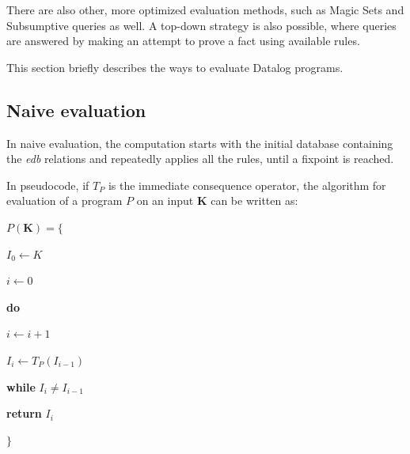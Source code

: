 \documentclass{pracamgr}
\theoremstyle{plain}
\theoremstyle{definition}
\theoremstyle{remark}
\begin{document}
There are also other, more optimized evaluation methods, such as Magic Sets and Subsumptive queries as well. A top-down strategy is also possible, where queries are answered by making an attempt to prove a fact using available rules.

This section briefly describes the ways to evaluate Datalog programs.

\subsection{Naive evaluation}
In naive evaluation, the computation starts with the initial database containing the \emph{edb} relations and repeatedly applies all the rules, until a fixpoint is reached.

In pseudocode, if $T_P$ is the immediate consequence operator, the algorithm for evaluation of a program $P$ on an input $\textbf{K}$ can be written as:

\parbox{0.5\textwidth}{
$P(\textbf{K}) = \{$

{\addtolength{\leftskip}{5mm}

$I_0 \leftarrow K$

$i \leftarrow 0$

\textbf{do}

{\addtolength{\leftskip}{5mm}

$i \leftarrow i + 1$

$I_i \leftarrow T_P(I_{i-1})$

}

\textbf{while} $I_i \ne I_{i-1}$

\textbf{return} $I_i$

}

$\}$
}
\end{document}

